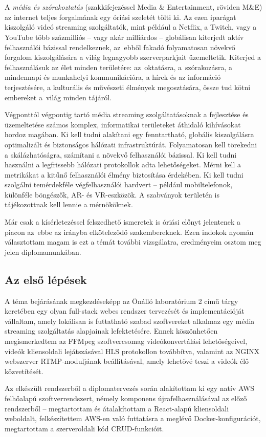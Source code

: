 \chapter{\bevezetes}

A \emph{média és szórakoztatás} (szakkifejezéssel Media \& Entertainment, röviden M\&E) az internet teljes forgalmának egy óriási szeletét tölti ki. Az ezen iparágat kiszolgáló videó streaming szolgáltatók, mint például a Netflix, a Twitch, vagy a YouTube több százmilliós -- vagy akár milliárdos -- globálisan kiterjedt aktív felhasználói bázissal rendelkeznek, az~ebből fakadó folyamatosan növekvő forgalom kiszolgálására a világ legnagyobb szerverparkjait üzemeltetik. Kiterjed a felhasználásuk az élet minden területére: az~oktatásra, a~szórakozásra, a mindennapi és munkahelyi kommunikációra, a hírek és az információ terjesztésére, a kulturális és művészeti élmények megosztására, össze tud kötni embereket a~világ minden tájáról.

Végponttól végpontig tartó média streaming szolgáltatásoknak a fejlesztése és üzemeltetése számos komplex, informatikai területeket áthidaló kihívásokat hordoz magában. Ki kell tudni alakítani egy fenntartható, globális kiszolgálásra optimalizált és biztonságos hálózati infrastruktúrát. Folyamatosan kell törekedni a skálázhatóságra, számítani a növekvő felhasználói bázissal. Ki kell tudni használni a legfrissebb hálózati protokollok adta lehetőségeket. Mérni kell a metrikákat a kitűnő felhasználói élmény biztosítása érdekében. Ki kell tudni szolgálni temérdekféle végfelhasználói hardvert -- például mobiltelefonok, különféle böngészők, AR- és VR-eszközök. A szabványok területén is tájékozottnak kell lennie a mérnököknek.

Már csak a kísérletezéssel felszedhető ismeretek is óriási előnyt jelentenek a piacon az~ebbe az irányba elköteleződő szakembereknek. Ezen indokok nyomán választottam magam is ezt a témát további vizsgálatra, eredményeim osztom meg jelen diplomamunkában.

\section{Az első lépések}\label{sec:elso_lepesek}

A téma bejárásának megkezdéseképp az Önálló laboratórium 2 című tárgy keretében egy olyan full-stack webes rendszer tervezését és implementációját vállaltam, amely lokálisan is futtatható szabad szoftvereket alkalmaz egy média streaming szolgáltatás alapjainak lefektetésére. Ennek köszönhetően megismerkedtem az FFMpeg szoftvercsomag videókonvertálási lehetőségeivel, videók kliensoldali lejátszásával HLS protokollon továbbítva, valamint az NGINX webszerver RTMP-moduljának beállításával, amely lehetővé teszi a videók élő közvetítését.

Az elkészült rendszerből a diplomatervezés során alakítottam ki egy natív AWS felhőalapú szoftverrendszert, némely komponens újrafelhasználásával az előző rendszerből -- megtartottam és átalakítottam a React-alapú kliensoldali weboldalt, felkészítettem AWS-en való futtatásra a meglévő Docker-konfigurációt, megtartottam a szerveroldali kód CRUD-funkcióit.
